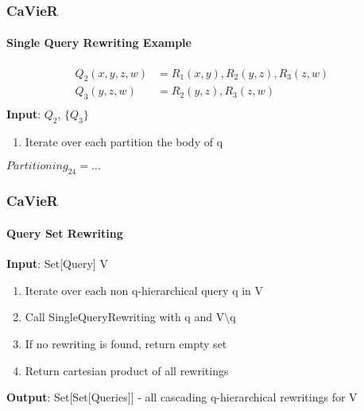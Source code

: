 \documentclass[
	11pt, %
]{beamer}
\begin{document}
\begin{frame}
	\frametitle{CaVieR}
	\framesubtitle{Single Query Rewriting Example}
	\begin{align*}
		Q_2(x,y,z,w) &= R_1(x,y), R_2(y,z), R_3(z,w) &\\
		Q_3(y,z,w) &= R_2(y,z), R_3(z,w)&\\
	\end{align*}
	\textbf{Input}: $Q_2$, $\{Q_3\}$
	\begin{enumerate}
		\item Iterate over each partition the body of q
	\end{enumerate}
	$Partitioning_24= \dots$
	\vspace{3cm}
\end{frame}

%


\begin{frame}
	\frametitle{CaVieR}
	\framesubtitle{Query Set Rewriting}
	\textbf{Input}: Set[Query] V
	\begin{enumerate}
		\item Iterate over each non q-hierarchical query q in V
		\item Call SingleQueryRewriting with q and $\text{V} \setminus \text{q}$
		\item If no rewriting is found, return empty set
		\item Return cartesian product of all rewritings
	\end{enumerate}
	\textbf{Output}: Set[Set[Queries]] - all cascading q-hierarchical rewritings for V
\end{frame}
\end{document}
